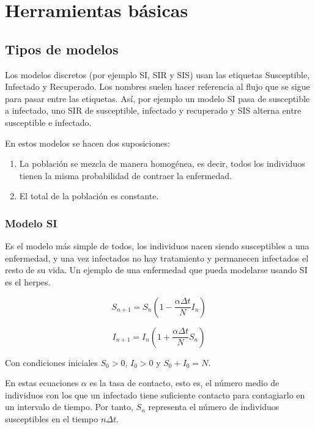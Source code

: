 \chapter{Herramientas básicas}

\section{Tipos de modelos}

Los modelos discretos (por ejemplo SI, SIR y SIS) usan las etiquetas Susceptible, Infectado y Recuperado. Los nombres suelen hacer referencia al flujo que se sigue para pasar entre las etiquetas. Así, por ejemplo un modelo SI pasa de susceptible a infectado, uno SIR de susceptible, infectado y recuperado y SIS alterna entre susceptible e infectado.

En estos modelos se hacen dos suposiciones:
\begin{enumerate}
\item La población se mezcla de manera homogénea, es decir, todos los individuos tienen la misma probabilidad de contraer la enfermedad.
\item El total de la población es constante.
\end{enumerate}

\subsection{Modelo SI}
Es el modelo más simple de todos, los individuos nacen siendo susceptibles a una enfermedad, y una vez infectados no hay tratamiento y permanecen infectados el resto de su vida.
Un ejemplo de una enfermedad que pueda modelarse usando SI es el herpes.

\begin{equation}
\label{eqn: SI_S}
S_{n+1}=S_n\left( 1-\frac{\alpha\Delta t}{N}I_n\right)
\end{equation}

\begin{equation}
\label{eqn: SI_I}
I_{n+1}=I_n\left( 1+\frac{\alpha\Delta t}{N}S_n\right)
\end{equation}

Con condiciones iniciales $S_0>0$, $I_0>0$ y $S_0+I_0=N$.

En estas ecuaciones $\alpha$ es la tasa de contacto, esto es, el número medio de individuos con los que un infectado tiene suficiente contacto para contagiarlo en un intervalo de tiempo. Por tanto, $S_n$ representa el número de individuos susceptibles en el tiempo $n\Delta t$.

